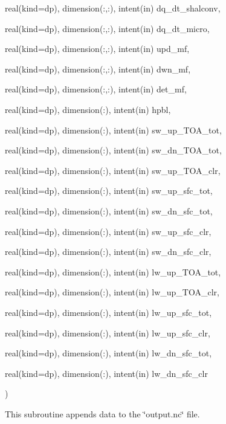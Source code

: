 {\begin{DoxyParamCaption}
\item[{real(kind=dp), dimension(\+:,\+:), intent(in)}]{dq\+\_\+dt\+\_\+shalconv, }
\item[{real(kind=dp), dimension(\+:,\+:), intent(in)}]{dq\+\_\+dt\+\_\+micro, }
\item[{real(kind=dp), dimension(\+:,\+:), intent(in)}]{upd\+\_\+mf, }
\item[{real(kind=dp), dimension(\+:,\+:), intent(in)}]{dwn\+\_\+mf, }
\item[{real(kind=dp), dimension(\+:,\+:), intent(in)}]{det\+\_\+mf, }
\item[{real(kind=dp), dimension(\+:), intent(in)}]{hpbl, }
\item[{real(kind=dp), dimension(\+:), intent(in)}]{sw\+\_\+up\+\_\+\+T\+O\+A\+\_\+tot, }
\item[{real(kind=dp), dimension(\+:), intent(in)}]{sw\+\_\+dn\+\_\+\+T\+O\+A\+\_\+tot, }
\item[{real(kind=dp), dimension(\+:), intent(in)}]{sw\+\_\+up\+\_\+\+T\+O\+A\+\_\+clr, }
\item[{real(kind=dp), dimension(\+:), intent(in)}]{sw\+\_\+up\+\_\+sfc\+\_\+tot, }
\item[{real(kind=dp), dimension(\+:), intent(in)}]{sw\+\_\+dn\+\_\+sfc\+\_\+tot, }
\item[{real(kind=dp), dimension(\+:), intent(in)}]{sw\+\_\+up\+\_\+sfc\+\_\+clr, }
\item[{real(kind=dp), dimension(\+:), intent(in)}]{sw\+\_\+dn\+\_\+sfc\+\_\+clr, }
\item[{real(kind=dp), dimension(\+:), intent(in)}]{lw\+\_\+up\+\_\+\+T\+O\+A\+\_\+tot, }
\item[{real(kind=dp), dimension(\+:), intent(in)}]{lw\+\_\+up\+\_\+\+T\+O\+A\+\_\+clr, }
\item[{real(kind=dp), dimension(\+:), intent(in)}]{lw\+\_\+up\+\_\+sfc\+\_\+tot, }
\item[{real(kind=dp), dimension(\+:), intent(in)}]{lw\+\_\+up\+\_\+sfc\+\_\+clr, }
\item[{real(kind=dp), dimension(\+:), intent(in)}]{lw\+\_\+dn\+\_\+sfc\+\_\+tot, }
\item[{real(kind=dp), dimension(\+:), intent(in)}]{lw\+\_\+dn\+\_\+sfc\+\_\+clr}
\end{DoxyParamCaption}
)}\hypertarget{group__output_gab0bd4f42c7b5f1cafe9879343e860d8b}{}\label{group__output_gab0bd4f42c7b5f1cafe9879343e860d8b}


This subroutine appends data to the \char`\"{}output.\+nc\char`\"{} file. 


